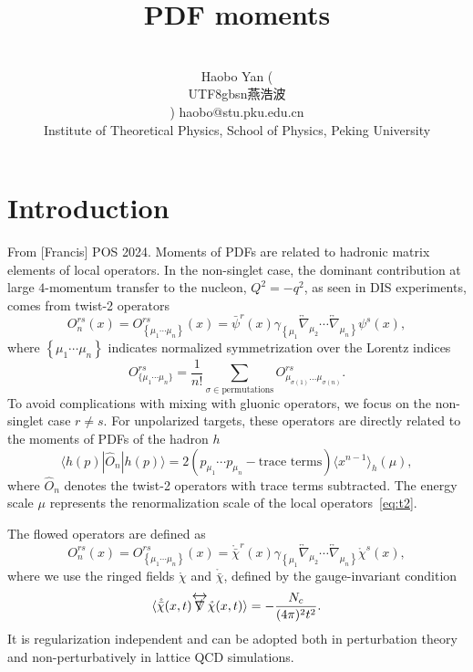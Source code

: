 \documentclass[10pt]{article}
\title{PDF moments}
\author{
~\\
\name Haobo Yan (\begin{CJK*}{UTF8}{gbsn}燕浩波\end{CJK*})
\email haobo@stu.pku.edu.cn \\
\addr Institute of Theoretical Physics, School of Physics, Peking University
}
\begin{document}
\maketitle
{\footnotesize
\tableofcontents\label{toc}
}





\clearpage

\section{Introduction}
From [Francis] POS 2024. Moments of PDFs are related to hadronic matrix elements of local operators. In the non-singlet case, the dominant contribution at large $4$-momentum transfer to the nucleon, $Q^2=-q^2$, as seen in DIS experiments, comes from twist-2 operators
\begin{equation}
O_n^{rs}(x) = O^{rs}_{\left\{\mu_1 \cdots \mu_n\right\}}(x) = \bar{\psi}^r(x) \gamma_{\left\{ \mu_1 \right.} \overleftrightarrow{\nabla}_{\mu_2} \cdots \overleftrightarrow{\nabla}_{\left. \mu_n \right\}} \psi^s(x),
\label{eq:t2}
\end{equation}
where $\left\{ \mu_1 \cdots \mu_n\right\}$ indicates normalized symmetrization over the Lorentz indices
\begin{equation}
O^{rs}_{\{\mu_1 \cdots \mu_n\}}=\frac{1}{n!}\sum_{\sigma\in\text{permutations}}O^{rs}_{\mu_{\sigma(1)}...\mu_{\sigma(n)}}.
\end{equation}
To avoid complications with mixing with gluonic operators, we focus on the non-singlet case $r \neq s$.
For unpolarized targets, these operators are directly related to the moments of PDFs of the hadron $h$ 
\begin{equation}
\langle h(p)| \widehat{O}_n |h(p) \rangle = 2
\left( p_{\mu_1} \cdots p_{\mu_n} - \text{trace~terms}\right) \langle x^{n-1} \rangle_h(\mu),
\label{eq:matrix}
\end{equation}
where $\widehat{O}_n$ denotes the twist-2 operators with trace terms subtracted. The energy scale $\mu$ represents the renormalization scale of the local operators~\eqref{eq:t2}.

The flowed operators are defined as
\begin{equation}
O_n^{rs}(x) = O^{rs}_{\left\{\mu_1 \cdots \mu_n\right\}}(x) = \mathring{\bar{\chi}}^r(x) \gamma_{\left\{ \mu_1 \right.} \overleftrightarrow{\nabla}_{\mu_2} \cdots \overleftrightarrow{\nabla}_{\left. \mu_n \right\}} \mathring{\chi}^s(x),
\label{eq:flowed_t2}
\end{equation}
where we use the ringed fields ${\mathring{\chi}}$ and ${\mathring{\bar{\chi}}}$, defined by the gauge-invariant condition
\begin{equation}
\langle \mathring{\bar{\chi}}(x,t) \overleftrightarrow{\slashed{\nabla}} \mathring{\chi}(x,t) \rangle = - \frac{N_c}{(4 \pi)^2 t^2}.
\end{equation}
It is regularization independent and can be adopted both in perturbation theory and non-perturbatively in lattice QCD simulations.
\end{document}
